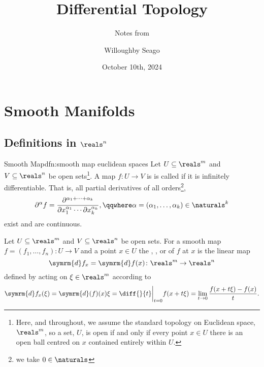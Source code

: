 \documentclass[fleqn]{NotesClass}
\title{Differential Topology}
\author{Willoughby Seago}
\date{October 10th, 2024}
\subtitle{Notes from}
\renewcommand{\dl}{\symrm{d}}
\begin{document}
    \frontmatter
    \titlepage
    \innertitlepage{}
    \tableofcontents
    \mainmatter
    
    \chapter{Smooth Manifolds}
    \section{Definitions in \texorpdfstring{\(\reals^n\)}{Rn}}
    \begin{dfn}{Smooth Map}{dfn:smooth map euclidean spaces}
        Let \(U \subseteq \reals^m\) and \(V \subseteq \reals^n\) be open sets\footnote{Here, and throughout, we assume the standard topology on Euclidean space, \(\reals^m\), so a set, \(U\), is open if and only if every point \(x \in U\) there is an open ball centred on \(x\) contained entirely within \(U\).}.
        A map \(f \colon U \to V\) is  is called  if it is infinitely differentiable.
        That is, all partial derivatives of all orders\footnote{we take \(0 \in \naturals\)},
        \begin{equation}
            \partial^\alpha f = \frac{\partial^{\alpha_1 + \dotsb + \alpha_k}}{\partial x_1^{\alpha_1} \dotsm \partial x_k^{\alpha_k}}, \qqwhere \alpha = (\alpha_1, \dotsc, \alpha_k) \in \naturals^{k}
        \end{equation}
        exist and are continuous.
    \end{dfn}
    
    \begin{dfn}{}{}
        Let \(U \subseteq \reals^m\) and \(V \subseteq \reals^n\) be open sets.
        For a smooth map \(f = (f_1, \dotsc, f_n) \colon U \to V\) and a point \(x \in U\) the , , or  of \(f\) at \(x\) is the linear map
        \begin{equation}
            \dl f_x = \dl f(x) \colon \reals^m \to \reals^n
        \end{equation}
        defined by acting on \(\xi \in \reals^m\) according to
        \begin{equation}
            \dl f_x(\xi) = \dl(f)(x)\xi = \diff{}{t}\bigg|_{t = 0} f(x + t\xi) = \lim_{t \to 0} \frac{f(x + t\xi) - f(x)}{t}.
        \end{equation}
    \end{dfn}
    
\end{document}
